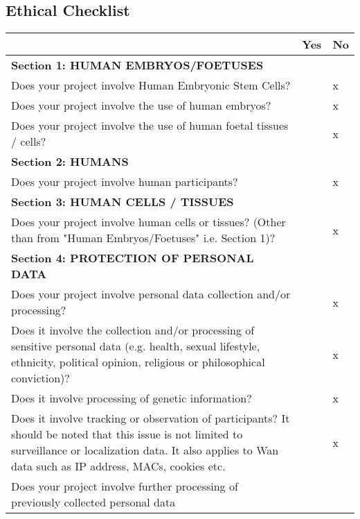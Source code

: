 \documentclass[a4paper,11pt,titlepage]{article}
\begin{document}
\subsection{Ethical Checklist}

\begin{table}[h!]
    \centering
    \begin{tabular}{|p{12.3cm}|l | l |}
    \hline
         & Yes & No 														  \\ \hline
        \cellcolor{green!20}\textbf{Section 1: HUMAN EMBRYOS/FOETUSES} &  &  		  \\ \hline
        Does your project involve Human Embryonic Stem Cells? &  & x 				  \\ \hline
        Does your project involve the use of human embryos? &  & x 					  \\ \hline
        Does your project involve the use of human foetal tissues / cells? &  & x 			  \\ \hline
        \cellcolor{green!20}\textbf{Section 2: HUMANS} &  & 						 	  \\ \hline
        Does your project involve human participants? &  & x 						  \\ \hline
        \cellcolor{green!20}\textbf{Section 3: HUMAN CELLS / TISSUES} &  &  			  \\ \hline
        Does your project involve human cells or tissues? (Other than from 
        "Human Embryos/Foetuses" i.e. Section 1)? &  & x 							  \\ \hline
        \cellcolor{green!20}\textbf{Section 4: PROTECTION OF PERSONAL DATA} &  &  	  \\ \hline
        Does your project involve personal data collection and/or processing? &  &  x		  \\ \hline
        Does it involve the collection and/or processing of sensitive personal data 
        (e.g. health, sexual lifestyle, ethnicity, political opinion, 
        religious or philosophical conviction)? &  & x 								  \\ \hline
        Does it involve processing of genetic information? &  & x 						  \\ \hline
        Does it involve tracking or observation of participants? 
        It should be noted that this issue is not limited to surveillance or localization data.
        It also applies to Wan data such as IP address, MACs, cookies etc. &  & x 		  \\ \hline
        Does your project involve further processing of previously collected personal data 

\end{tabular}
\end{table}
\end{document}
